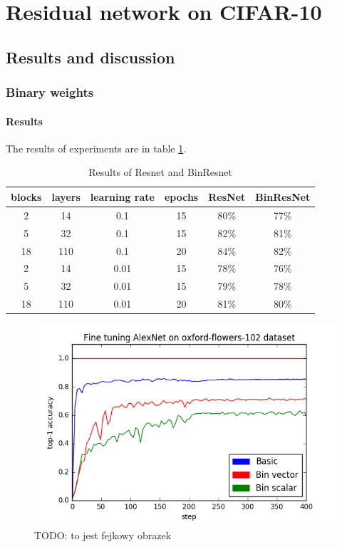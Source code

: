 \documentclass[licencjacka]{pracamgr}
\begin{document}
	\section{Residual network on CIFAR-10}
		\subsection{Results and discussion}
			\subsubsection{Binary weights}
		        \paragraph{Results} 
		     
		        The results of experiments are in table \ref{table:1}.
		        \begin{table}[H]
                    \caption{Results of Resnet and BinResnet}
                    \centering
                    \begin{tabular}{c c c c c c}
                    \hline\hline
                    blocks & layers & learning rate & epochs & ResNet & BinResNet  \\ [0.5ex]
                    \hline
                            2 & 14  & 0.1   & 15 & 80\% & 77\% \\
                            5 & 32  & 0.1   & 15 & 82\% & 81\% \\
                            18& 110 & 0.1   & 20 & 84\% & 82\%\\
                    \hline
                            2 & 14  & 0.01  & 15 & 78\% & 76\% \\
                            5 & 32  & 0.01  & 15 & 79\% & 78\% \\
                            18 & 110 & 0.01 & 20 & 81\% & 80\% \\
                    \hline
                    \end{tabular}
                    \label{table:1}
	            \end{table}
	            \begin{figure}[h]
				\centering
				\caption{TODO: to jest fejkowy obrazek}
				\includegraphics[width=\textwidth]{images/AlexNet-flowers-102}
			\end{figure}
\end{document}
